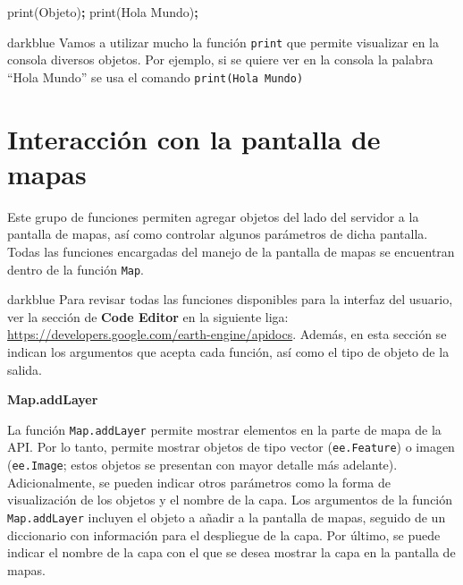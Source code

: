 \documentclass[
  12pt,
  letterpaper,
  twoside]{book}
\newenvironment{Shaded}{\begin{snugshade}}{\end{snugshade}}
\newcommand{\FunctionTok}[1]{\textcolor[rgb]{0.00,0.00,0.00}{#1}}
\newcommand{\NormalTok}[1]{#1}
\newcommand{\OperatorTok}[1]{\textcolor[rgb]{0.81,0.36,0.00}{\textbf{#1}}}
\newcommand{\StringTok}[1]{\textcolor[rgb]{0.31,0.60,0.02}{#1}}
\begin{document}
\begin{Shaded}
\begin{Highlighting}[]
\FunctionTok{print}\NormalTok{(Objeto)}\OperatorTok{;}
\FunctionTok{print}\NormalTok{(}\StringTok{\textquotesingle{}Hola Mundo\textquotesingle{}}\NormalTok{)}\OperatorTok{;}
\end{Highlighting}
\end{Shaded}

\begin{bluebox2}

\begin{awesomeblock}{5pt}{\faLightbulb}{darkblue}
Vamos a utilizar mucho la función \texttt{print} que permite visualizar en la consola diversos objetos. Por ejemplo, si se quiere ver en la consola la palabra ``Hola Mundo'' se usa el comando \texttt{print(\textquotesingle{}Hola\ Mundo\textquotesingle{})}

\end{awesomeblock}

\end{bluebox2}

\hypertarget{interacciuxf3n-con-la-pantalla-de-mapas}{%
\section{Interacción con la pantalla de mapas}\label{interacciuxf3n-con-la-pantalla-de-mapas}}

Este grupo de funciones permiten agregar objetos del lado del servidor a la pantalla de mapas, así como controlar algunos parámetros de dicha pantalla. Todas las funciones encargadas del manejo de la pantalla de mapas se encuentran dentro de la función \texttt{Map}.

\begin{bluebox2}

\begin{awesomeblock}{5pt}{\faLightbulb}{darkblue}
Para revisar todas las funciones disponibles para la interfaz del usuario, ver la sección de \textbf{Code Editor} en la siguiente liga: \url{https://developers.google.com/earth-engine/apidocs}. Además, en esta sección se indican los argumentos que acepta cada función, así como el tipo de objeto de la salida.

\end{awesomeblock}

\end{bluebox2}

\textbf{Map.addLayer}

La función \texttt{Map.addLayer} permite mostrar elementos en la parte de mapa de la API. Por lo tanto, permite mostrar objetos de tipo vector (\texttt{ee.Feature}) o imagen (\texttt{ee.Image}; estos objetos se presentan con mayor detalle más adelante). Adicionalmente, se pueden indicar otros parámetros como la forma de visualización de los objetos y el nombre de la capa. Los argumentos de la función \texttt{Map.addLayer} incluyen el objeto a añadir a la pantalla de mapas, seguido de un diccionario con información para el despliegue de la capa. Por último, se puede indicar el nombre de la capa con el que se desea mostrar la capa en la pantalla de mapas.
\end{document}
